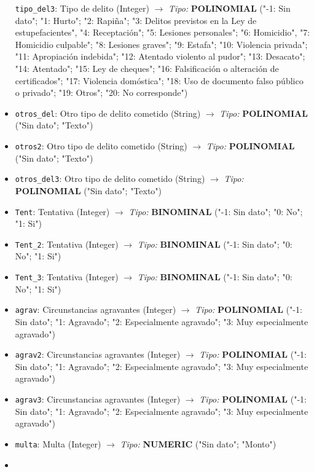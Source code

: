 \documentclass[11pt]{article}
\begin{document}
\begin{itemize}
  \texttt{tipo\_del3}: Tipo de delito (Integer) \(\rightarrow\)
  \emph{Tipo:} {\textbf{POLINOMIAL} ("-1: Sin dato"; "1: Hurto"; "2:
  Rapiña"; "3: Delitos previstos en la Ley de estupefacientes", "4:
  Receptación"; "5: Lesiones personales"; "6: Homicidio", "7: Homicidio
  culpable"; "8: Lesiones graves"; "9: Estafa"; "10: Violencia privada";
  "11: Apropiación indebida"; "12: Atentado violento al pudor"; "13:
  Desacato"; "14: Atentado"; "15: Ley de cheques"; "16: Falsificación o
  alteración de certificados"; "17: Violencia domóstica"; "18: Uso de
  documento falso público o privado"; "19: Otros"; "20: No
  corresponde")}
\item
  \texttt{otros\_del}: Otro tipo de delito cometido (String)
  \(\rightarrow\) \emph{Tipo:} {\textbf{POLINOMIAL} ("Sin dato";
  "Texto")}
\item
  \texttt{otros2}: Otro tipo de delito cometido (String) \(\rightarrow\)
  \emph{Tipo:} {\textbf{POLINOMIAL} ("Sin dato"; "Texto")}
\item
  \texttt{otros\_del3}: Otro tipo de delito cometido (String)
  \(\rightarrow\) \emph{Tipo:} {\textbf{POLINOMIAL} ("Sin dato";
  "Texto")}
\item
  \texttt{Tent}: Tentativa (Integer) \(\rightarrow\) \emph{Tipo:}
  {\textbf{BINOMINAL} ("-1: Sin dato"; "0: No"; "1: Si")}
\item
  \texttt{Tent\_2}: Tentativa (Integer) \(\rightarrow\) \emph{Tipo:}
  {\textbf{BINOMINAL} ("-1: Sin dato"; "0: No"; "1: Si")}
\item
  \texttt{Tent\_3}: Tentativa (Integer) \(\rightarrow\) \emph{Tipo:}
  {\textbf{BINOMINAL} ("-1: Sin dato"; "0: No"; "1: Si")}
\item
  \texttt{agrav}: Circunstancias agravantes (Integer) \(\rightarrow\)
  \emph{Tipo:} {\textbf{POLINOMIAL} ("-1: Sin dato"; "1: Agravado"; "2:
  Especialmente agravado"; "3: Muy especialmente agravado")}
\item
  \texttt{agrav2}: Circunstancias agravantes (Integer) \(\rightarrow\)
  \emph{Tipo:} {\textbf{POLINOMIAL} ("-1: Sin dato"; "1: Agravado"; "2:
  Especialmente agravado"; "3: Muy especialmente agravado")}
\item
  \texttt{agrav3}: Circunstancias agravantes (Integer) \(\rightarrow\)
  \emph{Tipo:} {\textbf{POLINOMIAL} ("-1: Sin dato"; "1: Agravado"; "2:
  Especialmente agravado"; "3: Muy especialmente agravado")}
\item
  \texttt{multa}: Multa (Integer) \(\rightarrow\) \emph{Tipo:}
  {\textbf{NUMERIC} ("Sin dato"; "Monto")}
\item

\end{itemize}
\end{document}
